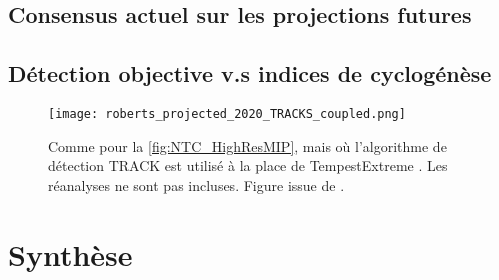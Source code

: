 \documentclass[../main.tex]{subfiles}
\begin{document}
\newpage
\subsection{Consensus actuel sur les projections futures}\label{sec:projections_futures}

\cite{seneviratne_weather_2021}

\newpage
\subsection{Détection objective v.s indices de cyclogénèse}\label{sec:tracking_vs_indices}

\cite{horn_tracking_2014}

\begin{figure}[htbp]
    \centering
    \texttt{[image: roberts\_projected\_2020\_TRACKS\_coupled.png]}
    \caption{Comme pour la \cref{fig:NTC_HighResMIP}, mais où l'algorithme de détection TRACK \parencite{hodges_how_2017} est utilisé à la place de
    TempestExtreme \parencite{ullrich_tempestextremes_2017,zarzycki_assessing_2017}. Les réanalyses ne sont pas incluses. Figure issue de
    \cite{roberts_projected_2020}.}
    \label{fig:NTC_HighResMIP_TRACK}
\end{figure}

\section{Synthèse}
\end{document}
